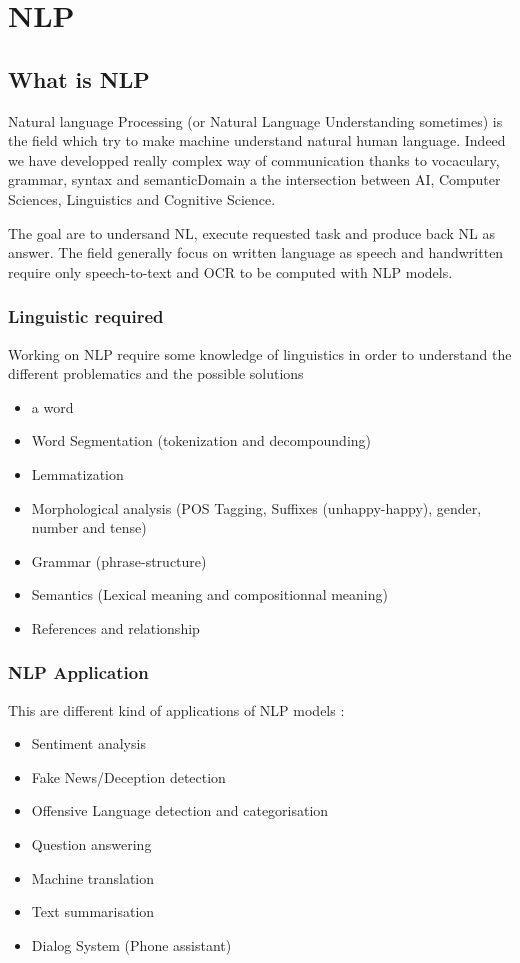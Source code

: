\chapter{NLP} %
\label{cha:nlp}


		\section{What is NLP}

			Natural language Processing (or Natural Language Understanding sometimes) is the field which try to make machine understand natural human language. Indeed we have developped really complex way of communication thanks to vocaculary, grammar, syntax and semanticDomain a the intersection between AI, Computer Sciences, Linguistics and Cognitive Science.

			The goal are to undersand NL, execute requested task and produce back NL as answer. The field generally focus on written language as speech and handwritten require only speech-to-text and OCR to be computed with NLP models. 

			\subsection{Linguistic required}

				Working on NLP require some knowledge of linguistics in order to understand the different problematics and the possible solutions
				\begin{itemize}
					\item  a word
					\item Word Segmentation (tokenization and decompounding)
					\item Lemmatization
					\item Morphological analysis (POS Tagging, Suffixes (unhappy-happy), gender, number and tense)
					\item Grammar (phrase-structure)
					\item Semantics (Lexical meaning and compositionnal meaning)
					\item References and relationship
				\end{itemize}

			\subsection{NLP Application}
				This are different kind of applications of NLP models :
				\begin{itemize}
					\item Sentiment analysis
					\item Fake News/Deception detection
					\item Offensive Language detection and categorisation
					\item Question answering
					\item Machine translation
					\item Text summarisation
					\item Dialog System (Phone assistant)
				\end{itemize}

